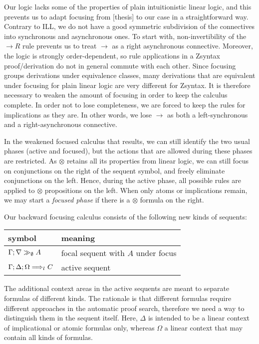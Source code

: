 Our logic lacks some of the properties of plain intuitionistic linear logic, and
this prevents us to adapt focusing from [thesis] to our case in a
straightforward way.
Contrary to ILL, we do not have a good symmetric subdivision of the connectives
into synchronous and asynchronous ones. To start with, non-invertibility of the
$\rightarrow R$ rule prevents us to treat $\rightarrow$ as a right asynchronous
connective. Moreover, the logic is strongly order-dependent, so rule
applications in a Zsyntax proof/derivation do not in general commute with each
other. Since focusing groups derivations under equivalence classes, many
derivations that are equivalent under focusing for plain linear logic are very
different for Zsyntax. It is therefore necessary to weaken the amount of
focusing in order to keep the calculus complete.
In order not to lose completeness, we are forced to keep the rules for
implications as they are. In other words, we lose $\rightarrow$ as both a
left-synchronous and a right-asynchronous connective.

In the weakened focused calculus that results, we can still identify the two
usual phases (active and focused), but the actions that are allowed during these
phases are restricted. As $\otimes$ retains all its properties from linear
logic, we can still focus on conjunctions on the right of the sequent symbol,
and freely eliminate conjunctions on the left. Hence, during the active phase,
all possible rules are applied to $\otimes$ propositions on the left. When only
atoms or implications remain, we may start a \emph{focused phase} if there is a
$\otimes$ formula on the right.

Our backward focusing calculus consists of the following new kinds of sequents:

\begin{table}[h]
  \centering
  \begin{tabular}{|l|l|}
    \hline
    \textbf{symbol} & \textbf{meaning} \\
    \hline
    $\Gamma; \nabla \gg_{\emptyset} A$ & focal sequent with $A$ under focus \\
    $\Gamma; \Delta; \Omega \Longrightarrow_{l_{}} C$ & active sequent \\
    \hline
  \end{tabular}
\end{table}

The additional context areas in the active sequents are meant to separate
formulas of different kinds. The rationale is that different formulas require
different approaches in the automatic proof search, therefore we need a way to
distinguish them in the sequent itself. Here, $\Delta$ is intended to be a
linear context of implicational or atomic formulas only, whereas $\Omega$ a
linear context that may contain all kinds of formulas.

